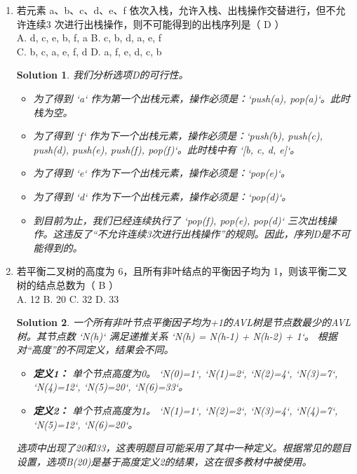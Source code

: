 \documentclass[UTF8]{report}
\newtheorem{solution}{Solution}
\theoremstyle{MyLineTheoremStyle} %
\theoremstyle{MyBlockTheoremStyle} %
\theoremstyle{MySubsubsectionStyle} %
\begin{document}
\begin{enumerate}
    \item 若元素 a、b、c、d、e、f 依次入栈，允许入栈、出栈操作交替进行，但不允许连续3 次进行出栈操作，则不可能得到的出栈序列是（ D ）\\
    A. d, c, e, b, f, a \quad B. c, b, d, a, e, f \\
    C. b, c, a, e, f, d \quad D. a, f, e, d, c, b
    \begin{solution}
        我们分析选项D的可行性。
        \begin{itemize}
            \item 为了得到 `a` 作为第一个出栈元素，操作必须是：`push(a), pop(a)`。此时栈为空。
            \item 为了得到 `f` 作为下一个出栈元素，操作必须是：`push(b), push(c), push(d), push(e), push(f), pop(f)`。此时栈中有 `[b, c, d, e]`。
            \item 为了得到 `e` 作为下一个出栈元素，操作必须是：`pop(e)`。
            \item 为了得到 `d` 作为下一个出栈元素，操作必须是：`pop(d)`。
            \item 到目前为止，我们已经连续执行了 `pop(f), pop(e), pop(d)` 三次出栈操作。这违反了“不允许连续3次进行出栈操作”的规则。因此，序列D是不可能得到的。
        \end{itemize}
    \end{solution}
    \item 若平衡二叉树的高度为 6，且所有非叶结点的平衡因子均为 1，则该平衡二叉树的结点总数为（ B ）\\
    A. 12 \quad B. 20 \quad C. 32 \quad D. 33
    \begin{solution}
        一个所有非叶节点平衡因子均为+1的AVL树是节点数最少的AVL树。其节点数 `N(h)` 满足递推关系 `N(h) = N(h-1) + N(h-2) + 1`。
        根据对“高度”的不同定义，结果会不同。
        \begin{itemize}
            \item \textbf{定义1：} 单个节点高度为0。
            `N(0)=1`, `N(1)=2`, `N(2)=4`, `N(3)=7`, `N(4)=12`, `N(5)=20`, `N(6)=33`。
            \item \textbf{定义2：} 单个节点高度为1。
            `N(1)=1`, `N(2)=2`, `N(3)=4`, `N(4)=7`, `N(5)=12`, `N(6)=20`。
        \end{itemize}
        选项中出现了20和33，这表明题目可能采用了其中一种定义。根据常见的题目设置，选项B(20)是基于高度定义2的结果，这在很多教材中被使用。
    \end{solution}


\end{enumerate}
\end{document}
